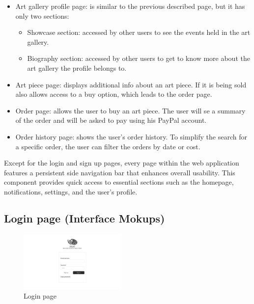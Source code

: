 \begin{itemize}
    \item Art gallery profile page: is similar to the previous described page, but it has only two sections:
    \begin{itemize}
        \item Showcase section: accessed by other users to see the events held in the art gallery.
        \item Biography section: accessed by other users to get to know more about the art gallery the profile belongs to.
    \end{itemize}
    \item Art piece page: displays additional info about an art piece. If it is being sold also allows access to a buy option, which leads to the order page.
    \item Order page: allows the user to buy an art piece. The user will se a summary of the order and will be asked to pay using his PayPal account.
    \item Order history page: shows the user's order history. To simplify the search for a specific order, the user can filter the orders by date or cost. 
\end{itemize}

Except for the login and sign up pages, every page within the web application features a persistent side navigation bar that enhances overall usability. 
This component provides quick access to essential sections such as the homepage, notifications, settings, and the user’s profile.

\newcommand{\myfigwidth}{0.47\textwidth}

\subsection{Login page (Interface Mokups)}
\begin{figure}[H]
    \centering
    \includegraphics[width=\myfigwidth]{images/interface_mockups/Landing page - login.pdf}
    \caption{Login page}
\end{figure}

